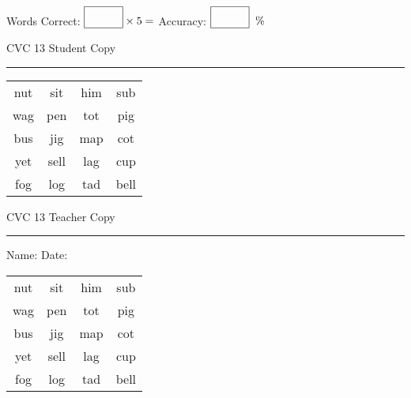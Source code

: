 \documentclass{memoir}
\begin{document}
\small

Words Correct: $\fbox{\phantom{\huge 100}} \times 5 = $ Accuracy: $\fbox{\phantom{\huge 100}}\;\; \%$ 

\vfill

\newpage


\footnotesize \noindent
CVC 13 \hfill Student Copy
\smallskip
\hrule

\Large

\setlength{\tabcolsep}{14pt}
\def\arraystretch{2}

{\selectfont


\begin{vplace}[0.5]
\begin{center}
\begin{tabular}{cccc}
nut & sit & him & sub \\
wag & pen & tot & pig \\
bus & jig & map & cot \\
yet & sell & lag & cup \\
fog & log & tad & bell \\
\end{tabular}
\end{center}
\end{vplace}

}

\newpage

\footnotesize \noindent
CVC 13 \hfill Teacher Copy
\smallskip
\hrule

\small

\vfill

\noindent
Name: \underline{\hspace{1.75in}} \hfill Date: \underline{\hspace{1in}}

\Large

{\selectfont


\begin{vplace}[0.5]
\begin{center}
\begin{tabular}{cccc}
nut & sit & him & sub \\
wag & pen & tot & pig \\
bus & jig & map & cot \\
yet & sell & lag & cup \\
fog & log & tad & bell \\
\end{tabular}
\end{center}
\end{vplace}



}
\end{document}
